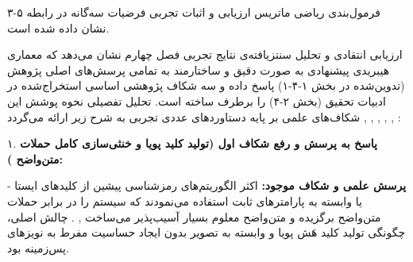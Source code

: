 

فرمول‌بندی ریاضی ماتریس ارزیابی و اثبات تجربی فرضیات سه‌گانه در رابطه ۵{-}۳ نشان داده شده است.\par








ارزیابی انتقادی و تحلیل سنتزیافته‌ی نتایج تجربی فصل چهارم نشان می‌دهد که معماری هیبریدی پیشنهادی به صورت دقیق و ساختارمند به تمامی پرسش‌های اصلی پژوهش (تدوین‌شده در بخش ۱{-}۴{-}۱) پاسخ داده و سه شکاف پژوهشی اساسی استخراج‌شده در ادبیات تحقیق (بخش ۲{-}۴) را برطرف ساخته است. تحلیل تفصیلی نحوه پوشش این شکاف‌های علمی بر پایه دستاوردهای عددی تجربی به شرح زیر ارائه می‌گردد , , , , , :\par



۱. \textbf{پاسخ به پرسش و رفع شکاف اول (تولید کلید پویا و خنثی‌سازی کامل حملات متن‌واضح ):}\par

{-} \textbf{پرسش علمی و شکاف موجود:} اکثر الگوریتم‌های رمزشناسی پیشین از کلیدهای ایستا یا وابسته به پارامترهای ثابت استفاده می‌نمودند که سیستم را در برابر حملات متن‌واضح برگزیده  و متن‌واضح معلوم  بسیار آسیب‌پذیر می‌ساخت , . چالش اصلی، چگونگی تولید کلید هَش پویا و وابسته به تصویر بدون ایجاد حساسیت مفرط به نویزهای پس‌زمینه بود.\par

